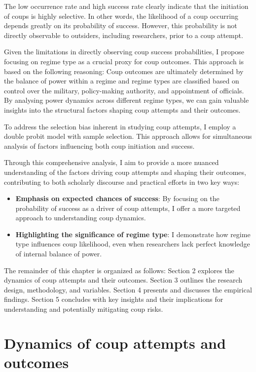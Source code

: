 \documentclass[
  12pt,
]{report}
\begin{document}
The low occurrence rate and high success rate clearly indicate that the
initiation of coups is highly selective. In other words, the likelihood
of a coup occurring depends greatly on its probability of success.
However, this probability is not directly observable to outsiders,
including researchers, prior to a coup attempt.

Given the limitations in directly observing coup success probabilities,
I propose focusing on regime type as a crucial proxy for coup outcomes.
This approach is based on the following reasoning: Coup outcomes are
ultimately determined by the balance of power within a regime and regime
types are classified based on control over the military, policy-making
authority, and appointment of officials. By analysing power dynamics
across different regime types, we can gain valuable insights into the
structural factors shaping coup attempts and their outcomes.

To address the selection bias inherent in studying coup attempts, I
employ a double probit model with sample selection. This approach allows
for simultaneous analysis of factors influencing both coup initiation
and success.

Through this comprehensive analysis, I aim to provide a more nuanced
understanding of the factors driving coup attempts and shaping their
outcomes, contributing to both scholarly discourse and practical efforts
in two key ways:

\begin{itemize}
\item
  \textbf{Emphasis on expected chances of success}: By focusing on the
  probability of success as a driver of coup attempts, I offer a more
  targeted approach to understanding coup dynamics.
\item
  \textbf{Highlighting the significance of regime type}: I demonstrate
  how regime type influences coup likelihood, even when researchers lack
  perfect knowledge of internal balance of power.
\end{itemize}

The remainder of this chapter is organized as follows: Section 2
explores the dynamics of coup attempts and their outcomes. Section 3
outlines the research design, methodology, and variables. Section 4
presents and discusses the empirical findings. Section 5 concludes with
key insights and their implications for understanding and potentially
mitigating coup risks.

\section{Dynamics of coup attempts and
outcomes}\label{dynamics-of-coup-attempts-and-outcomes}
\end{document}
